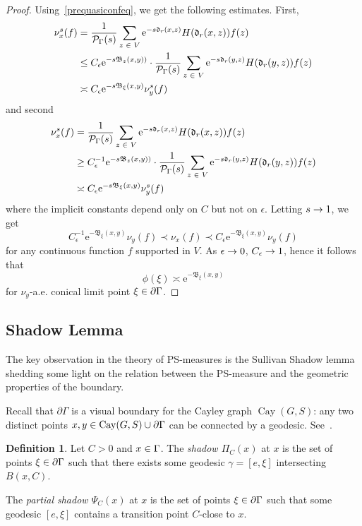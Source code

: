 \documentclass[10pt,a4paper]{amsart}
\newcommand{\pG}{\partial{\Gamma}}
\newcommand{\rme}{\mathrm{e}}
\newcommand{\fkd}{\mathfrak{d}}
\newcommand{\fkB}{\mathfrak{B}}
\newcommand{\clP}{\mathcal{P}}
\DeclareMathOperator{\Cay}{Cay}
\let\oldin\in
\renewcommand{\in}{\mathchoice{\oldin}{\oldin}{\,\oldin\,}{\,\oldin\,}}
\renewcommand*{\to}{\mathchoice{\longrightarrow}{\rightarrow}{\rightarrow}{\rightarrow}}
\theoremstyle{definition}\newtheorem{defi}[theo]{Definition}
\begin{document}
\begin{proof}
Using~\eqref{prequasiconfeq}, we get the following estimates. First,
\begin{align*}
\nu^s_x(f) & = \frac{1}{\clP_{\Gamma}(s)} \sum\limits_{z \in V}
\rme^{-s \fkd_r(x,z)} H(\fkd_r(x,z)) {f(z)} \\
& \leq C_\epsilon \rme^{-s\fkB_{z}(x, y))}\cdot \frac{1}{\clP_{\Gamma}(s)}
\sum\limits_{z \in V}
\rme^{-s\fkd_r(y, z)} H(\fkd_r(y, z)) {f(z)}\\
& \asymp C_\epsilon \rme^{-s\fkB_\xi(x, y)} \nu^s_y(f)
\end{align*}
and second
\begin{align*}
\nu^s_x(f) & = \frac{1}{\clP_{\Gamma}(s)} \sum\limits_{z \in V}
\rme^{-s \fkd_r(x,z)} H(\fkd_r(x,z)) {f(z)} \\
& \geq C_\epsilon^{-1} \rme^{-s\fkB_{z}(x, y))}\cdot \frac{1}{\clP_{\Gamma}(s)}
\sum\limits_{z \in V}
\rme^{-s\fkd_r(y, z)} H(\fkd_r(y, z)) {f(z)}\\
& \asymp C_\epsilon \rme^{-s\fkB_\xi(x, y)} \nu^s_y(f)
\end{align*}
where the implicit constants depend only on $C$ but not on $\epsilon$. Letting $s\to 1$, we get
\[
C_\epsilon^{-1} \rme^{-\fkB_\xi(x, y)}\nu_y(f)\prec \nu_x(f) \prec C_\epsilon \rme^{-\fkB_\xi(x, y)} \nu_y(f)
\]
for any continuous function $f$ supported in $V$. As $\epsilon\to 0$, $C_\epsilon\to 1$, hence it follows that
\[
\phi(\xi) \asymp \rme^{-
\fkB_\xi (x, y)}
\]
for $\nu_y$-a.e. conical limit point $\xi \in \pG$.
\end{proof}

\subsection{Shadow Lemma}

The key observation in the theory of PS-measures is the Sullivan Shadow lemma shedding some light on the relation between the PS-measure and the geometric properties of the boundary.

Recall that $\partial \Gamma$ is a visual boundary for the Cayley graph $\Cay(G,S)$: any two distinct points $x,y\in \Cay(G,S)\cup \partial \Gamma$ can be connected by a geodesic. See~\cite[Proposition~2.4]{GePoJEMS}.

\begin{defi}
Let $C>0$ and $x \in\Gamma$. The \emph{shadow $\Pi_C(x)$} at $x$ is the set of points $\xi \in \pG$ such that there exists some geodesic $\gamma=[e, \xi]$ intersecting $B(x, C)$.

The \emph{partial shadow $ \Psi_{C}(x)$} at $x$ is the set of points $\xi \in \pG$ such that some geodesic $[e,\xi]$ contains a transition point $C$-close to $x$.
\end{defi}
\end{document}
